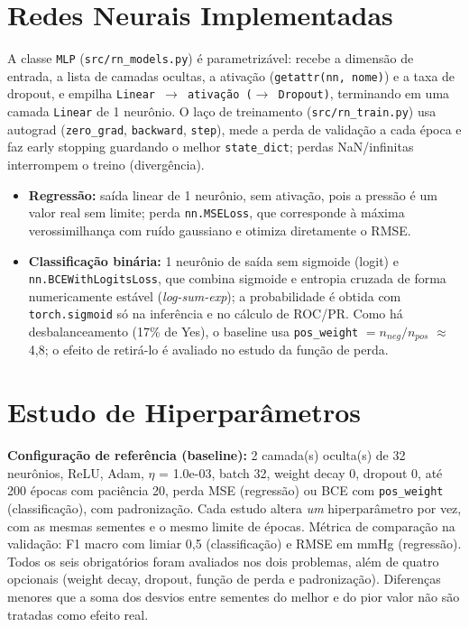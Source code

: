 \documentclass[11pt,a4paper]{article}
\begin{document}
\section{Redes Neurais Implementadas}
A classe \texttt{MLP} (\texttt{src/rn\_models.py}) é parametrizável: recebe a dimensão de entrada, a lista de camadas ocultas, a
ativação (\texttt{getattr(nn, nome)}) e a taxa de dropout, e empilha \texttt{Linear $\to$ ativação ($\to$ Dropout)}, terminando
em uma camada \texttt{Linear} de 1 neurônio. O laço de treinamento (\texttt{src/rn\_train.py}) usa autograd
(\texttt{zero\_grad}, \texttt{backward}, \texttt{step}), mede a perda de validação a cada época e faz early stopping guardando o melhor
\texttt{state\_dict}; perdas NaN/infinitas interrompem o treino (divergência).
\begin{itemize}
\item \textbf{Regressão:} saída linear de 1 neurônio, sem ativação, pois a pressão é um valor real sem limite; perda
\texttt{nn.MSELoss}, que corresponde à máxima verossimilhança com ruído gaussiano e otimiza diretamente o RMSE.
\item \textbf{Classificação binária:} 1 neurônio de saída sem sigmoide (logit) e \texttt{nn.BCEWithLogitsLoss}, que combina sigmoide
e entropia cruzada de forma numericamente estável (\emph{log-sum-exp}); a probabilidade é obtida com \texttt{torch.sigmoid} só na
inferência e no cálculo de ROC/PR. Como há desbalanceamento (17\% de Yes), o baseline usa \texttt{pos\_weight} $= n_{neg}/n_{pos}$
$\approx$ 4,8; o efeito de retirá-lo é avaliado no estudo da função de perda.
\end{itemize}

\section{Estudo de Hiperparâmetros}\label{sec:hp}
\textbf{Configuração de referência (baseline):} 2 camada(s) oculta(s) de 32 neurônios, ReLU, Adam, $\eta$ = 1.0e-03, batch 32, weight decay 0, dropout 0, até 200 épocas com paciência 20, perda MSE (regressão) ou BCE com \texttt{pos\_weight} (classificação),
com padronização. Cada estudo altera \emph{um} hiperparâmetro por vez, com as mesmas sementes e o mesmo limite de épocas.
Métrica de comparação na validação: F1 macro com limiar 0,5 (classificação) e RMSE em mmHg (regressão). Todos os seis obrigatórios
foram avaliados nos dois problemas, além de quatro opcionais (weight decay, dropout, função de perda e padronização).
Diferenças menores que a soma dos desvios entre sementes do melhor e do pior valor não são tratadas como efeito real.
\end{document}
